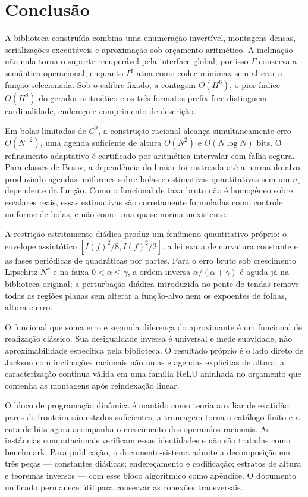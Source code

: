\section{Conclusão}
\label{sec:conclusion}

A biblioteca construída combina uma enumeração invertível, montagens densas,
serializações executáveis e aproximação sob orçamento aritmético. A inclinação
não nula torna o suporte recuperável pela interface global; por isso
$\Gamma$ conserva a semântica operacional, enquanto $\Gamma^\sharp$ atua como
codec minimax sem alterar a função selecionada. Sob o calibre fixado, a
contagem $\Theta(H^6)$, o pior índice $\Theta(H^8)$ do gerador aritmético e os
três formatos prefix-free distinguem cardinalidade, endereço e comprimento de
descrição.

Em bolas limitadas de $C^2$, a construção racional alcança simultaneamente
erro $O(N^{-2})$, uma agenda suficiente de altura $O(N^2)$ e
$O(N\log N)$ bits. O refinamento adaptativo
é certificado por aritmética intervalar com falha segura. Para classes de
Besov, a dependência do limiar foi rastreada até a norma do alvo, produzindo
agendas uniformes sobre bolas e estimativas quantitativas sem um
$n_0$ dependente da função. Como o funcional de taxa bruto não é homogêneo
sobre escalares reais, essas estimativas são corretamente formuladas como
controle uniforme de bolas, e não como uma quase-norma inexistente.

A restrição estritamente diádica produz um fenômeno quantitativo próprio: o
envelope assintótico $[I(f)^2/8,I(f)^2/2]$, a lei exata de curvatura constante
e as fases periódicas de quadráticas por partes. Para o erro bruto sob
crescimento Lipschitz $N^\gamma$ e na faixa $0<\alpha\le\gamma$, a ordem inversa
$\alpha/(\alpha+\gamma)$ é aguda já na biblioteca original; a perturbação
diádica introduzida no pente de tendas remove todas as regiões planas sem
alterar a função-alvo nem os expoentes de folhas, altura e erro.

O funcional que soma erro e segunda diferença do aproximante é um funcional
de realização clássico. Sua desigualdade inversa é universal e mede suavidade,
não aproximabilidade específica pela biblioteca. O resultado próprio é o lado
direto de Jackson com inclinações racionais não nulas e agendas explícitas de
altura; a caracterização continua válida em uma família ReLU aninhada no
orçamento que contenha as montagens após reindexação linear.

O bloco de programação dinâmica é mantido como teoria auxiliar de exatidão:
pares de fronteira são estados suficientes, a truncagem torna o catálogo
finito e a cota de bits agora acompanha o crescimento dos operandos racionais.
As instâncias computacionais verificam essas identidades e não são tratadas
como benchmark. Para publicação, o documento-sistema admite a decomposição em
três peças --- constantes diádicas; endereçamento e codificação; estratos de
altura e teoremas inversos --- com esse bloco algorítmico como apêndice. O
documento unificado permanece útil para conservar as conexões transversais.


